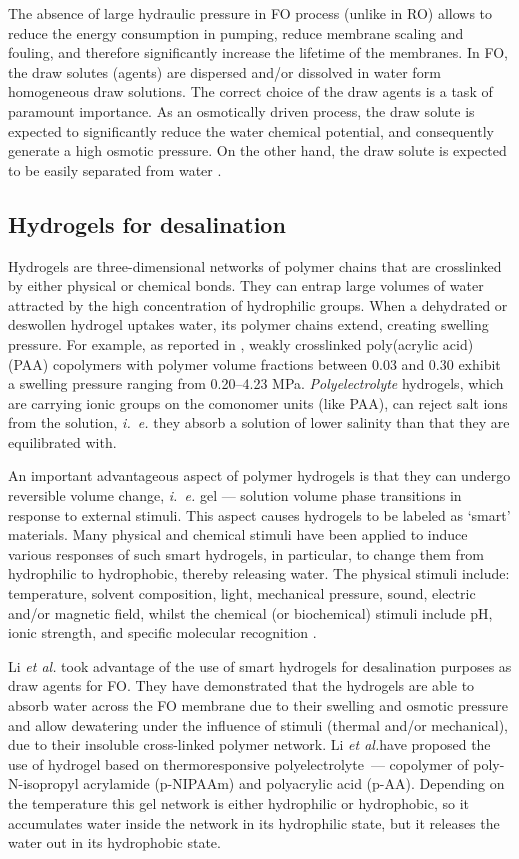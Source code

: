 \documentclass[journal,article,submit,pdftex,moreauthors]{Definitions/mdpi}
\newcommand{\ie}{\textit{i.~e.} }
\newcommand{\etal}{\textit{et al.}{}}
\begin{document}
The absence of large hydraulic pressure in FO process (unlike in RO) allows to reduce the energy consumption in pumping, reduce membrane scaling and fouling, and therefore significantly increase the lifetime of the membranes. 
In FO, the draw solutes (agents) are dispersed and/or dissolved in water form homogeneous draw solutions. 
The correct choice of the draw agents is a task of paramount importance. 
As an osmotically driven process, the draw solute is expected to significantly reduce the water chemical potential, and consequently generate a high osmotic pressure. 
On the other hand, the draw solute is expected to be easily separated from water \cite{Cai2016}.

\subsection{Hydrogels for desalination}
Hydrogels are three-dimensional networks of polymer chains that are crosslinked by either physical or chemical bonds.
They can entrap large volumes of water attracted by the high concentration of hydrophilic groups.
When a dehydrated or deswollen hydrogel uptakes water, its polymer chains extend, creating swelling pressure.
For example, as reported in \cite{Wack_2009}, weakly crosslinked poly(acrylic acid) (PAA) copolymers with polymer volume fractions between 0.03 and 0.30 exhibit a swelling pressure ranging from 0.20--4.23 MPa.
\emph{Polyelectrolyte} hydrogels, which are carrying ionic groups on the comonomer units (like PAA), can reject salt ions from the solution, \ie they absorb a solution of lower salinity than that they are equilibrated with.

An important advantageous aspect of polymer hydrogels is that they can undergo reversible volume change, \ie gel --- solution volume phase transitions in response to external stimuli.
This aspect causes hydrogels to be labeled as ‘smart’ materials.
Many physical and chemical stimuli have been applied to induce various responses of such smart hydrogels, in particular, to change them from hydrophilic to hydrophobic, thereby releasing water.
The physical stimuli include: temperature, solvent composition, light, mechanical pressure, sound, electric and/or magnetic field, whilst the chemical (or biochemical) stimuli include pH, ionic strength, and specific molecular recognition \cite{Tanaka_1982,Serizawa_2001,Lietor_Santos_2009,Qiu_2001}.

Li \etal \cite{Li2011} took advantage of the use of smart hydrogels for desalination purposes as draw agents for FO.
They have demonstrated that the hydrogels are able to absorb water across the FO membrane due to their swelling and osmotic pressure and
allow dewatering under the influence of stimuli (thermal and/or mechanical), due to their insoluble cross-linked polymer network.
Li \etal have proposed the use of hydrogel based on thermoresponsive polyelectrolyte~--- copolymer of poly-N-isopropyl acrylamide (p-NIPAAm) and polyacrylic acid (p-AA). Depending on the temperature this gel network is either hydrophilic or hydrophobic, so it accumulates water inside the network in its hydrophilic state, but it releases the water out in its hydrophobic state.
\end{document}
